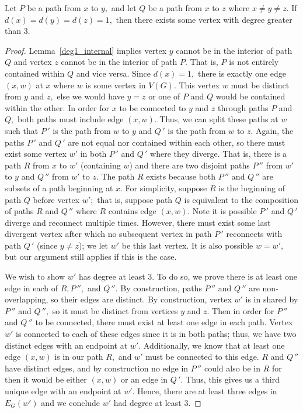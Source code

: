 \begin{prop}\label{shared_interior3}
    Let $P$ be a path from $x$ to $y,$ and let $Q$ be a path from $x$ to $z$ where $x \neq y \neq z.$ If $d(x) = d(y) = d(z) = 1,$ then there exists some vertex with degree greater than $3.$
\end{prop}
\begin{proof}
Lemma~\ref{deg1_internal} implies vertex $y$ cannot be in the interior of path $Q$ and vertex $z$ cannot be in the interior of path $P.$ That is, $P$ is not entirely contained within $Q$ and vice versa. Since $d(x) = 1,$ there is exactly one edge $(x, w)$ at $x$ where $w$ is some vertex in $V(G).$ This vertex $w$ must be distinct from $y$ and $z,$ else we would have $y = z$ or one of $P$ and $Q$ would be contained within the other. In order for $x$ to be connected to $y$ and $z$ through paths $P$ and $Q,$ both paths must include edge $(x, w).$ Thus, we can split these paths at $w$ such that $P\,'$ is the path from $w$ to $y$ and $Q\,'$ is the path from $w$ to $z.$ Again, the paths $P\,'$ and $Q\,'$ are not equal nor contained within each other, so there must exist some vertex $w'$ in both $P\,'$ and $Q\,'$ where they diverge. That is, there is a path $R$ from $x$ to $w'$ (containing $w$) and there are two disjoint paths $P\,''$ from $w'$ to $y$ and $Q\,''$ from $w'$ to $z.$ The path $R$ exists because both $P\,''$ and $Q\,''$ are subsets of a path beginning at $x.$ For simplicity, suppose $R$ is the beginning of path $Q$ before vertex $w';$ that is, suppose path $Q$ is equivalent to the composition of paths $R$ and $Q\,''$ where $R$ contains edge $(x, w).$ Note it is possible $P\,'$ and $Q\,'$ diverge and reconnect multiple times. However, there must exist some last divergent vertex after which no subsequent vertex in path $P\,'$ reconnects with path $Q\,'$ (since $y \neq z$); we let $w'$ be this last vertex. It is also possible $w = w',$ but our argument still applies if this is the case.

We wish to show $w'$ has degree at least $3.$ To do so, we prove there is at least one edge in each of $R, P\,'',$ and $Q\,''.$ By construction, paths $P\,''$ and $Q\,''$ are non-overlapping, so their edges are distinct. By construction, vertex $w'$ is in shared by $P\,''$ and $Q\,'',$ so it must be distinct from vertices $y$ and $z.$ Then in order for $P\,''$ and $Q\,''$ to be connected, there must exist at least one edge in each path. Vertex $w'$ is connected to each of these edges since it is in both paths; thus, we have two distinct edges with an endpoint at $w'.$ Additionally, we know that at least one edge $(x, w)$ is in our path $R,$ and $w'$ must be connected to this edge. $R$ and $Q\,''$ have distinct edges, and by construction no edge in $P\,''$ could also be in $R$ for then it would be either $(x, w)$ or an edge in $Q\,'.$ Thus, this gives us a third unique edge with an endpoint at $w'.$ Hence, there are at least three edges in $E_G(w')$ and we conclude $w'$ had degree at least $3.$
\end{proof}

